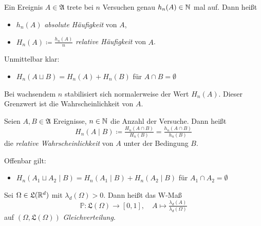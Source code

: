 \documentclass{cheat-sheet}
\newcommand{\Alg}{\mathfrak{A}} %
\newcommand{\LebAlg}{\mathfrak{L}} %
\renewcommand{\P}{\mathbb{P}}
\begin{document}

\begin{defn}
  Ein Ereignis $A \in \Alg$ trete bei $n$ Versuchen genau $h_n(A) \in \mathbb{N}$ mal auf. Dann heißt
  \begin{itemize}
    \item $h_n(A)$ \emph{absolute Häufigkeit} von $A$,
    \item $H_n(A) \coloneqq \tfrac{h_n(A)}{n}$ \emph{relative Häufigkeit} von $A$.
  \end{itemize}
\end{defn}

\begin{bem}
  Unmittelbar klar:
  \begin{itemize}
    \item $H_n(A \sqcup B) = H_n(A) + H_n(B)$ für $A \cap B = \emptyset$
  \end{itemize}
\end{bem}

\begin{bem}
  Bei wachsendem $n$ stabilisiert sich normalerweise der Wert $H_n(A)$. Dieser Grenzwert ist die Wahrscheinlichkeit von $A$.
\end{bem}



\begin{defn}
  Seien $A, B \in \Alg$ Ereignisse, $n \in \mathbb{N}$ die Anzahl der Versuche. Dann heißt
  \[ H_n(A \mid B) \coloneqq \tfrac{H_n(A \cap B)}{H_n(B)} = \tfrac{h_n(A \cap B)}{h_n(B)} \]
  die \emph{relative Wahrscheinlichkeit} von $A$ unter der Bedingung $B$.
\end{defn}

\begin{bem}
  Offenbar gilt:
  \begin{itemize}
    \item $H_n(A_1 \sqcup A_2 \mid B) = H_n(A_1 \mid B) + H_n(A_2 \mid B)$ für $A_1 \cap A_2 = \emptyset$
  \end{itemize}
\end{bem}


\begin{defn}
  Sei $\Omega \in \LebAlg(\R^d)$ mit $\lambda_d(\Omega) > 0$. Dann heißt das W-Maß
  \[ \P : \LebAlg(\Omega) \to [0, 1], \quad A \mapsto \tfrac{\lambda_d(A)}{\lambda_d(\Omega)} \]
  auf $(\Omega, \LebAlg(\Omega))$ \emph{Gleichverteilung}.
\end{defn}
\end{document}
